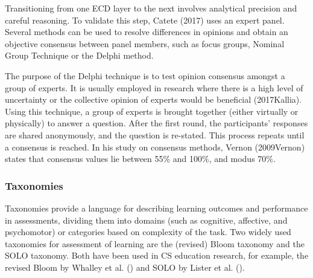 Transitioning from one ECD layer to the next involves analytical precision and careful reasoning. To validate this step, Catete (2017) uses an expert panel. Several methods can be used to resolve differences in opinions and obtain an objective consensus between panel members, such as focus groups, Nominal Group Technique or the Delphi method.

The purpose of the Delphi technique is to test opinion consensus amongst a group of experts. It is usually employed in research where there is a high level of uncertainty or the collective opinion of
experts would be beneficial (2017Kallia). Using this technique, a group of experts is brought together (either virtually or physically) to answer a question. After the first round, the participants' responses are shared anonymously, and the question is re-stated. This process repeats until a consensus is reached. In his study on consensus methods, Vernon (2009Vernon) states that consensus values lie between 55\% and 100\%, and modus 70\%.





\subsubsection*{Taxonomies}

Taxonomies provide a language for describing learning outcomes and
performance in assessments, dividing them into domains (such as cognitive, affective, and psychomotor) or categories based on complexity of the task. Two widely used taxonomies for assessment of learning are the (revised) Bloom
taxonomy and the SOLO taxonomy. Both have been used in CS education research, for example, the revised Bloom by Whalley et al. (\cite{Whalley2006}) and SOLO by Lister et al. (\cite{lister2006not}\cite{lister2010naturally}).

